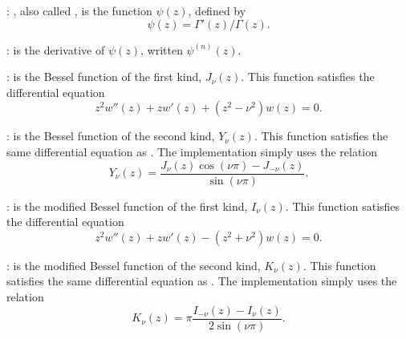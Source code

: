 {{{{{{{{{{{\noindent
{}: \hfill\newline
   , also called ,
is the function $\psi(z)$,
   defined by
\begin{displaymath}
\psi(z) = \Gamma'(z)/\Gamma(z).
\end{displaymath}

\noindent
{}: \hfill\newline
    is the  derivative of
   $\psi(z)$, written $\psi^{(n)}(z)$.

\noindent
{}: \hfill\newline
    is the Bessel function of the first kind,
   $J_\nu (z)$.
   This function satisfies the differential equation
\begin{displaymath}
z^2 w''(z) + z w'(z) + (z^2-\nu^2)w(z) = 0.
\end{displaymath}

\noindent
{}: \hfill\newline
    is the Bessel function of the second kind,
   $Y_\nu (z)$.
   This function satisfies the same differential equation as
   .
   The implementation simply uses the relation
\begin{displaymath}
Y_\nu (z) = \frac{J_\nu (z) \cos(\nu \pi) - J_{-\nu} (z)}{\sin(\nu \pi)}.
\end{displaymath}

\noindent
{}: \hfill\newline
    is the modified Bessel function of the first kind,
   $I_\nu (z)$.
   This function satisfies the differential equation
\begin{displaymath}
z^2 w''(z) + z w'(z) - (z^2+\nu^2)w(z) = 0.
\end{displaymath}

\noindent
{}: \hfill\newline
    is the modified Bessel function of the second kind,
   $K_\nu (z)$.
   This function satisfies the same differential equation as .
   The implementation simply uses the relation
\begin{displaymath}
K_\nu (z) = \pi \frac{I_{-\nu} (z) - I_{\nu} (z)}{2 \sin(\nu \pi)}.
\end{displaymath}

}}}}}}}}}}}
